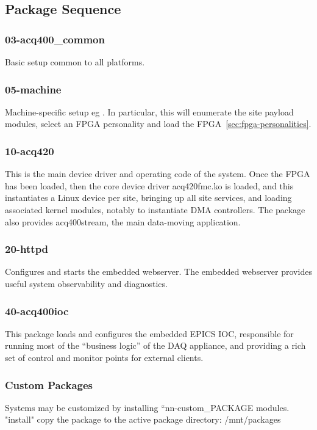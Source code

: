 \documentclass[]{article}
\begin{document}
\subsection{Package Sequence}


\subsubsection{03-acq400_common}
Basic setup common to all platforms.

\subsubsection{05-machine}
Machine-specific setup eg .
In particular, this will enumerate the site payload modules, select an FPGA personality and load the FPGA~\ref{sec:fpga-personalities}.

\subsubsection{10-acq420}
This is the main device driver and operating code of the  system.
Once the FPGA has been loaded, then the core device driver acq420fmc.ko is loaded, and this instantiates a Linux device per site, bringing up all site services, and loading associated kernel modules, notably to instantiate DMA controllers. The package also provides acq400stream, the main data-moving application.

\subsubsection{20-httpd}
Configures and starts the embedded webserver. The embedded webserver provides useful system observability and diagnostics.

\subsubsection{40-acq400ioc}
This package loads and configures the embedded EPICS IOC, responsible for running most of the “business logic” of the DAQ appliance, and providing a rich set of control and monitor points for external clients.

\subsubsection{Custom Packages}
Systems may be customized by installing “nn-custom_PACKAGE modules.
"install" copy the package to the active package directory: /mnt/packages
\end{document}
